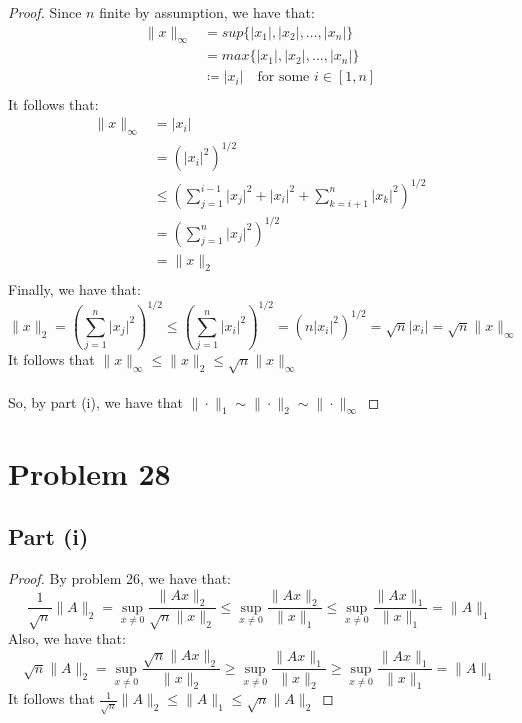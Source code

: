 \documentclass{article}
\begin{document}
\begin{proof}
Since $n$ finite by assumption, we have that:
\begin{align*}
\|x\|_{\infty} &= sup\{\lvert x_1 \rvert, \lvert x_2 \rvert, \dots, \lvert x_n \rvert \} \\
&= max\{\lvert x_1 \rvert, \lvert x_2 \rvert, \dots, \lvert x_n \rvert \} \\
&\coloneqq \lvert x_i \rvert \quad \text{for some $i \in [1, n]$} \\
\end{align*}
It follows that:
\begin{align*}
\|x\|_{\infty} &= \lvert x_i \rvert \\
&= (\lvert x_i \rvert^2)^{1/2} \\
&\leq \left(\sum\limits_{j = 1}^{i - 1} \lvert x_j \rvert^2 + \lvert x_i \rvert^2 + \sum\limits_{k = i + 1}^{n} \lvert x_k \rvert^2 \right)^{1 / 2} \\
&= \left(\sum\limits_{j = 1}^{n} \lvert x_j \rvert^2\right)^{1 / 2} \\
&= \|x\|_{2} \\
\end{align*}
Finally, we have that:
$$\|x\|_{2} = \left(\sum\limits_{j = 1}^{n} \lvert x_j \rvert^2\right)^{1 / 2} \leq \left(\sum\limits_{j = 1}^{n} \lvert x_i \rvert^2\right)^{1 / 2} = (n\lvert x_i \rvert^2)^{1 / 2} = \sqrt{n}\lvert x_i \rvert = \sqrt{n}\|x\|_{\infty}$$
It follows that $\|x\|_{\infty} \leq \|x\|_{2} \leq \sqrt{n}\|x\|_{\infty}$ \\
\\
So, by part (i), we have that $\| \cdot \|_1 \sim \| \cdot \|_2 \sim \| \cdot \|_{\infty}$
\end{proof}

\section*{Problem 28}

\subsection*{Part (i)}
\begin{proof}
By problem 26, we have that:
$$\frac{1}{\sqrt{n}}\|A\|_2 = \sup_{x \ne 0}\frac{\|Ax\|_2}{\sqrt{n}\|x\|_2} \leq \sup_{x \ne 0}\frac{\|Ax\|_2}{\|x\|_1} \leq \sup_{x \ne 0}\frac{\|Ax\|_1}{\|x\|_1} = \|A\|_1$$
Also, we have that:
$$\sqrt{n}\|A\|_2 = \sup_{x \ne 0}\frac{\sqrt{n}\|Ax\|_2}{\|x\|_2} \geq \sup_{x \ne 0}\frac{\|Ax\|_1}{\|x\|_2} \geq \sup_{x \ne 0}\frac{\|Ax\|_1}{\|x\|_1} = \|A\|_1$$
It follows that $\frac{1}{\sqrt{n}}\|A\|_2 \leq \|A\|_1 \leq \sqrt{n}\|A\|_2$
\end{proof}
\end{document}
